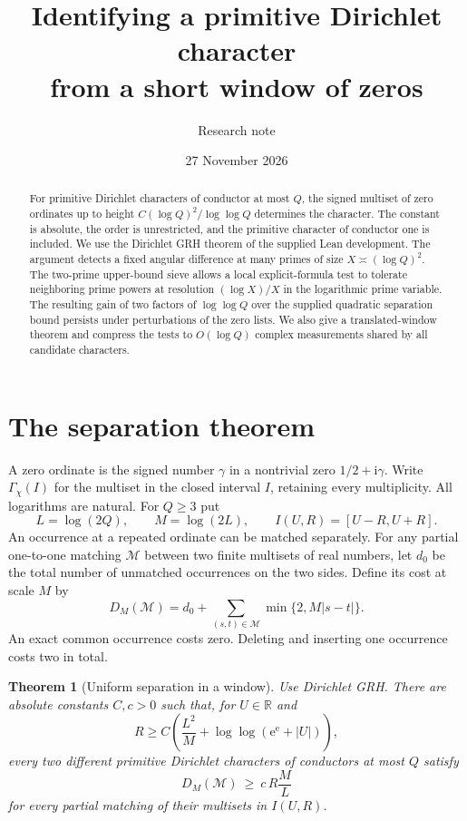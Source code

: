 \documentclass[11pt]{article}
\title{Identifying a primitive Dirichlet character\\from a short window of zeros}
\author{Research note}
\date{27 November 2026}
\newtheorem{theorem}{Theorem}[section]
\newcommand{\R}{\mathbb R}
\newcommand{\me}{\mathrm e}
\newcommand{\ii}{\mathrm i}
\begin{document}
\maketitle
\begin{abstract}
For primitive Dirichlet characters of conductor at most $Q$, the signed multiset of zero ordinates up to height $C(\log Q)^2/\log\log Q$ determines the character. The constant is absolute, the order is unrestricted, and the primitive character of conductor one is included. We use the Dirichlet GRH theorem of the supplied Lean development. The argument detects a fixed angular difference at many primes of size $X\asymp(\log Q)^2$. The two-prime upper-bound sieve allows a local explicit-formula test to tolerate neighboring prime powers at resolution $(\log X)/X$ in the logarithmic prime variable. The resulting gain of two factors of $\log\log Q$ over the supplied quadratic separation bound persists under perturbations of the zero lists. We also give a translated-window theorem and compress the tests to $O(\log Q)$ complex measurements shared by all candidate characters.
\end{abstract}

\section{The separation theorem}
A zero ordinate is the signed number $\gamma$ in a nontrivial zero $1/2+\ii\gamma$. Write $\Gamma_\chi(I)$ for the multiset in the closed interval $I$, retaining every multiplicity. All logarithms are natural. For $Q\ge3$ put
\[
 L=\log(2Q),\qquad M=\log(2L),\qquad I(U,R)=[U-R,U+R].
\]
An occurrence at a repeated ordinate can be matched separately. For any partial one-to-one matching $\mathcal M$ between two finite multisets of real numbers, let $d_0$ be the total number of unmatched occurrences on the two sides. Define its cost at scale $M$ by
\[
 D_M(\mathcal M)=d_0+\sum_{(s,t)\in\mathcal M}\min\{2,M|s-t|\}.
\]
An exact common occurrence costs zero. Deleting and inserting one occurrence costs two in total.

\begin{theorem}[Uniform separation in a window]\label{th:main}
Use Dirichlet GRH. There are absolute constants $C,c>0$ such that, for $U\in\R$ and
\begin{equation}
 R\ge C\left(\frac{L^2}{M}+\log\log(\me^\me+|U|)\right),\label{eq:width}
\end{equation}
every two different primitive Dirichlet characters of conductors at most $Q$ satisfy
\begin{equation}
 D_M(\mathcal M)\ \ge\ c\,R\frac{M}{L}\label{eq:cost}
\end{equation}
for every partial matching of their multisets in $I(U,R)$.
\end{theorem}
\end{document}
